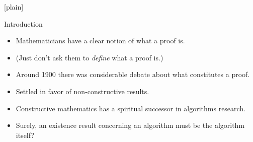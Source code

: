 




\pgfplotsset{compat=1.15}
[plain]



\begin{frame}
  \titlepage
\end{frame}




\begin{frame}{Introduction}
   \begin{itemize}
  \item {Mathematicians have a clear notion of what a proof is.
  } \pause
  \item { (Just don't ask them to \emph{define} what a proof is.)
  } \pause
  \item { Around 1900 there was considerable debate about what constitutes a proof.
  } \pause
  \item { Settled in favor of non-constructive results.
  } \pause
  \item { Constructive mathematics has a spiritual successor in algorithms research.
  } \pause
   \item { Surely, an existence result concerning an algorithm must be the algorithm itself?
  }
  \end{itemize}
\note{

}
\end{frame}

